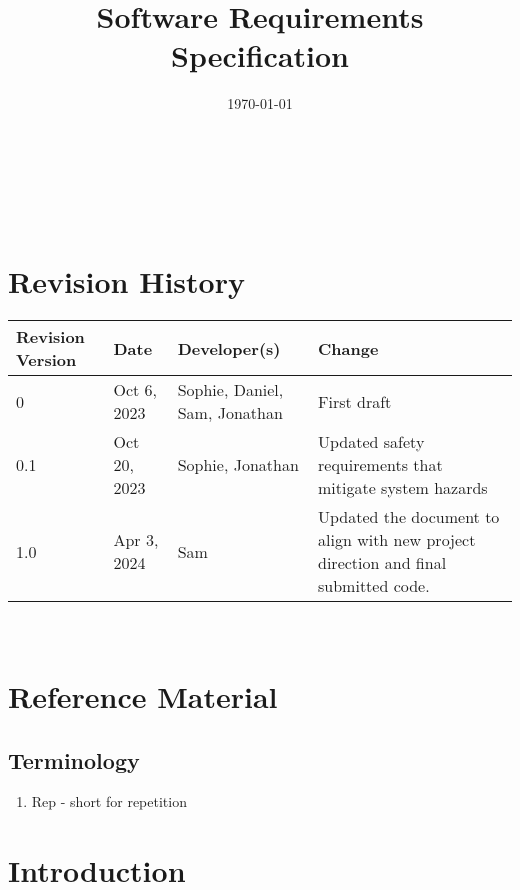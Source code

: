 \documentclass[12pt]{article}
\begin{document}
\title{Software Requirements Specification\\ \progname} 
\author{\authname}
\date{\today}
	
\maketitle

~\newpage


\tableofcontents

~\newpage

\section*{Revision History}

\begin{table}[hp]
		\centering
		\begin{tabularx}{\textwidth}{lllX}
			\toprule
			\textbf{Revision Version} & \textbf{Date} & \textbf{Developer(s)} & \textbf{Change}\\
			\midrule
			0 & Oct 6, 2023 & Sophie, Daniel, Sam, Jonathan & First draft\\
            \hline
            0.1 & Oct 20, 2023 & Sophie, Jonathan & Updated safety requirements that mitigate system hazards\\
            \hline
            1.0 & Apr 3, 2024 & Sam & Updated the document to align with new project direction and final submitted code.\\
			\bottomrule
		\end{tabularx}
	\end{table}


~\newpage

\section{Reference Material}

\subsection{Terminology}
\begin{enumerate}
    \item Rep - short for repetition 
\end{enumerate}


\section{Introduction}
\end{document}
